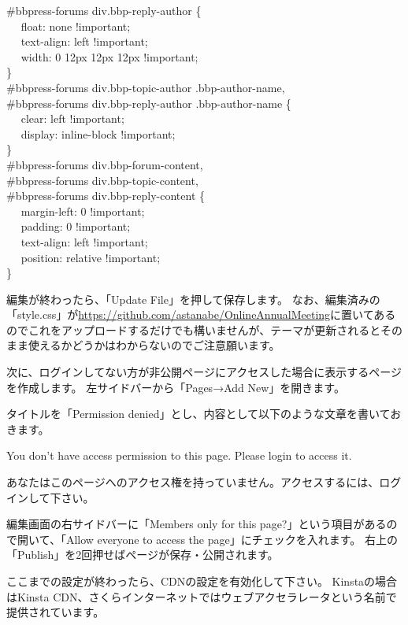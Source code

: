 \documentclass[titlepage,10pt,a4paper,uplatex]{jsbook}
\newenvironment{content}{\begin{shaded}\vspace{-1em}\raggedright\ttfamily\footnotesize\setlength{\baselineskip}{1.4em}}{\end{shaded}\vspace{-1em}}
\begin{document}
\begin{content}
\#bbpress-forums div.bbp-reply-author \{\\
 ~ ~float: none !important;\\
 ~ ~text-align: left !important;\\
 ~ ~width: 0 12px 12px 12px !important;\\
\}\\
\#bbpress-forums div.bbp-topic-author .bbp-author-name,\\
\#bbpress-forums div.bbp-reply-author .bbp-author-name \{\\
 ~ ~clear: left !important;\\
 ~ ~display: inline-block !important;\\
\}\\
\#bbpress-forums div.bbp-forum-content,\\
\#bbpress-forums div.bbp-topic-content,\\
\#bbpress-forums div.bbp-reply-content \{\\
 ~ ~margin-left: 0 !important;\\
 ~ ~padding: 0 !important;\\
 ~ ~text-align: left !important;\\
 ~ ~position: relative !important;\\
\}
\end{content}

編集が終わったら、「Update File」を押して保存します。
なお、編集済みの「style.css」が\url{https://github.com/astanabe/OnlineAnnualMeeting}に置いてあるのでこれをアップロードするだけでも構いませんが、テーマが更新されるとそのまま使えるかどうかはわからないのでご注意願います。

次に、ログインしてない方が非公開ページにアクセスした場合に表示するページを作成します。
左サイドバーから「Pages→Add New」を開きます。

タイトルを「Permission denied」とし、内容として以下のような文章を書いておきます。

\begin{content}
You don't have access permission to this page. Please login to access it.

あなたはこのページへのアクセス権を持っていません。アクセスするには、ログインして下さい。
\end{content}

編集画面の右サイドバーに「Members only for this page?」という項目があるので開いて、「Allow everyone to access the page」にチェックを入れます。
右上の「Publish」を2回押せばページが保存・公開されます。

ここまでの設定が終わったら、CDNの設定を有効化して下さい。
Kinstaの場合はKinsta CDN、さくらインターネットではウェブアクセラレータという名前で提供されています。
\end{document}

